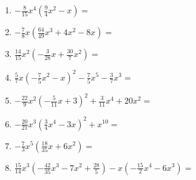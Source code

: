 \begin{Exercise}[title={Löse die Klammern auf und fasse soweit wie möglich zusammen}, label=aufloesenA1]
\begin{minipage}{\textwidth}
\begin{minipage}{0.54\textwidth}
\begin{enumerate}[label=\alph*)]
				\item \(-\frac{8}{15}x^4\left(\frac{9}{4}x^2- x\right) =\)
				\item \(-\frac{7}{8}x\left(\frac{64}{49}x^3+ 4x^2-8x\right) =\)
				\item \(\frac{14}{15}x^2\left(-\frac{3}{28}x+ \frac{30}{7}x^2\right) =\)
				\item \(\frac{5}{7}x\left(-\frac{7}{5}x^2-x \right)^2-\frac{7}{5}x^5-\frac{3}{7}x^3 =\)
				\item \(-\frac{22}{9}x^2\left(-\frac{5}{11}x+3 \right)^2 +\frac{3}{11}x^4+20x^2=\)
				\item \(-\frac{20}{21}x^3\left(\frac{3}{4}x^4-3x \right)^2+x^{10} =\)
				\item \(-\frac{7}{3}x^5\left(\frac{18}{35}x+ 6x^2\right) =\)
				\item \(\frac{15}{14}x^3\left(-\frac{42}{35}x^3-7x^2+\frac{28}{5} \right)-x\left(-\frac{15}{2}x^4-6x^3\right)=\)
			\end{enumerate}
		\end{minipage}%
	\end{minipage}%
\end{Exercise}
